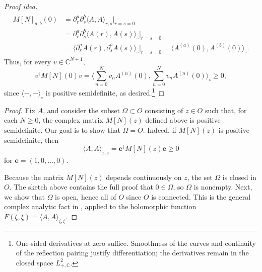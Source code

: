 \documentclass[11pt, letterpaper, reqno]{amsart}
\theoremstyle{definition}
\theoremstyle{remark}
\newcommand{\bbC}{\mathbb{C}}
\newcommand{\bfe}{\mathbf{e}}
\begin{document}
\begin{proof}[Proof idea]
\begin{align}
\begin{split}
 M[N]_{a,b}(0)
 &=\partial_r^a\partial_s^b\langle A,A\rangle_{r,s}
       \Big|_{r=s=0}\\
 &=\partial_r^a\partial_s^b\langle A(r),A(s)\rangle_\circ
       \Big|_{r=s=0}\\
 &=\langle\partial_r^a A(r),\partial_s^b A(s)\rangle_\circ
       \Big|_{r=s=0}
 =\langle A^{(a)}(0),A^{(b)}(0)\rangle_\circ.
\end{split}
\end{align}
Thus, for every $v\in\bbC^{N+1}$,
\begin{equation}
 v^\dagger M[N](0)v
 =\Big\langle\sum_{n=0}^Nv_nA^{(n)}(0),
              \sum_{n=0}^Nv_nA^{(n)}(0)\Big\rangle_\circ\geq0,
\end{equation}
since $\langle-,-\rangle_\circ$ is positive semidefinite, as
desired.\footnote{One-sided derivatives at zero suffice. Smoothness
of the curves and continuity of the reflection pairing justify
differentiation; the derivatives remain in the closed space $L^2_{+,\bbC}$.}
\end{proof}

\begin{proof}
Fix $A$, and consider the subset $\Omega\subset O$ consisting of
$z\in O$ such that, for each $N\geq0$, the complex matrix $M[N](z)$
defined above is positive semidefinite.
Our goal is to show that $\Omega=O$. Indeed, if $M[N](z)$ is
positive semidefinite, then
\begin{equation}
 \langle A,A\rangle_{z,\bar z}
 =\bfe^\dagger M[N](z)\bfe\geq0
\end{equation}
for $\bfe=(1,0,\dots,0)$.

Because the matrix $M[N](z)$ depends continuously on $z$, the set
$\Omega$ is closed in $O$.
The sketch above contains the full proof that $0\in\Omega$, so
$\Omega$ is nonempty.
Next, we show that $\Omega$ is open, hence all of $O$ since $O$ is
connected. This is the general complex analytic fact in
, applied to the holomorphic function
$F(\zeta,\xi)=\langle A,A\rangle_{\zeta,\xi}$.
\end{proof}
\end{document}
